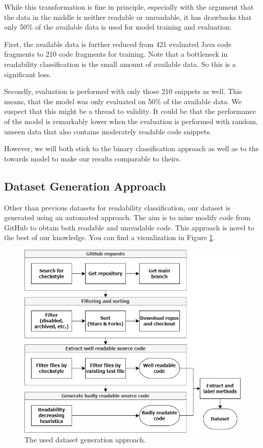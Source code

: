 \documentclass[%
class=scrreprt,
chapterprefix=false,%
open=right,%
twoside=false,%
paper=a4,%
logofile={Logo\_zentral\_farbig\_EN.png},%
thesistype=master,%
UKenglish,%
]{se2thesis}
\theoremstyle{definition}
\begin{document}
	While this transformation is fine in principle, especially with the argument that the data in the middle is neither readable or unreadable, it has drawbacks that only 50\% of the available data is used for model training and evaluation:
	
	First, the available data is further reduced from 421 evaluated Java code fragments to 210 code fragments for training. Note that a bottleneck in readability classification is the small amount of available data. So this is a significant loss.
	
	Secondly, evaluation is performed with only those 210 snippets as well. This means, that the model was only evaluated on 50\% of the available data. We suspect that this might be a thread to validity. It could be that the performance of the model is remarkably lower when the evaluation is performed with random, unseen data that also contains moderately readable code snippets.
	
	However, we will both stick to the binary classification approach as well as to the towards model \cite{mi2022towards} to make our results comparable to theirs.
	
\subsection{Dataset Generation Approach} \label{Dataset Generation Approach}
	Other than previous datasets for readability classification, our dataset is generated using an automated approach. The aim is to mine modify code from GitHub to obtain both readable and unreadable code. This approach is novel to the best of our knowledge. You can find a visualization in Figure \ref{fig:dataset_generation}.
	
	\begin{figure}[t]
		\centering
		\includegraphics[width=\textwidth]{img/dataset_generation.png}
		\caption{The used dataset generation approach.}
		\label{fig:dataset_generation}
	\end{figure}
	
\end{document}
